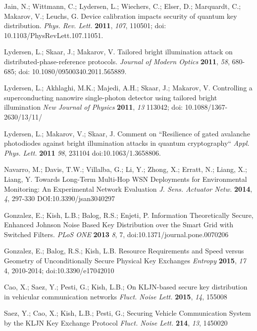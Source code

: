 \documentclass{ws-fnl2}
\begin{document}
\begin{thebibliography}{99}
Jain, N.; Wittmann, C.; Lydersen, L.; Wiechers, C.; Elser, D.; Marquardt, C.; Makarov, V.; Leuchs, G. Device
calibration impacts security of quantum key distribution. {\em Phys. Rev. Lett.} {\bf 2011}, {\em 107}, 110501; doi: 10.1103/PhysRevLett.107.11051.

Lydersen, L.; Skaar, J.; Makarov, V. Tailored bright illumination attack on distributed-phase-reference protocols. {\em Journal of Modern Optics} {\bf 2011}, {\em 58}, 680-685; doi: 10.1080/09500340.2011.565889.

Lydersen, L.; Akhlaghi, M.K.; Majedi, A.H.; Skaar, J.; Makarov, V. Controlling a superconducting nanowire single-photon detector using tailored bright illumination {\em New Journal of Physics} {\bf 2011}, {\em 13} 113042; doi: 10.1088/1367-2630/13/11/

Lydersen, L.; Makarov, V.; Skaar, J. Comment on ``Resilience of gated avalanche photodiodes against bright illumination attacks in quantum cryptography`` {\em Appl. Phys. Lett.} {\bf 2011} {\em 98}, 231104 doi:10.1063/1.3658806.






Navarro, M.; Davis, T.W.; Villalba, G.; Li, Y.; Zhong, X.; Erratt, N.; Liang, X.; Liang, Y. Towards Long-Term Multi-Hop WSN Deployments for Environmental Monitoring: An Experimental Network Evaluation {\em J. Sens. Actuator Netw.} {\bf 2014}, {\em 4}, 297-330 DOI:10.3390/jsan3040297


Gonzalez, E.; Kish, L.B.; Balog, R.S.; Enjeti, P. Information Theoretically Secure, Enhanced Johnson Noise Based Key Distribution over the Smart Grid with Switched Filters. {\em PLoS ONE} {\bf 2013} {\em 8}, 7, doi:10.1371/journal.pone.0070206

Gonzalez, E.; Balog, R.S.; Kish, L.B. Resource Requirements and Speed versus Geometry of Unconditionally Secure Physical Key Exchanges {\em Entropy} {\bf 2015}, {\em 17} 4, 2010-2014; doi:10.3390/e17042010

Cao, X.; Saez, Y.; Pesti, G.; Kish, L.B.; On KLJN-based secure key distribution in vehicular communication networks {\em Fluct. Noise Lett.} {\bf 2015}, {\em 14}, 155008 

Saez, Y.; Cao, X.; Kish, L.B.; Pesti, G.; Securing Vehicle Communication System by the KLJN Key Exchange Protocol {\em Fluct. Noise Lett.} {\bf 214}, {\em 13}, 1450020

\end{thebibliography}
\end{document}
